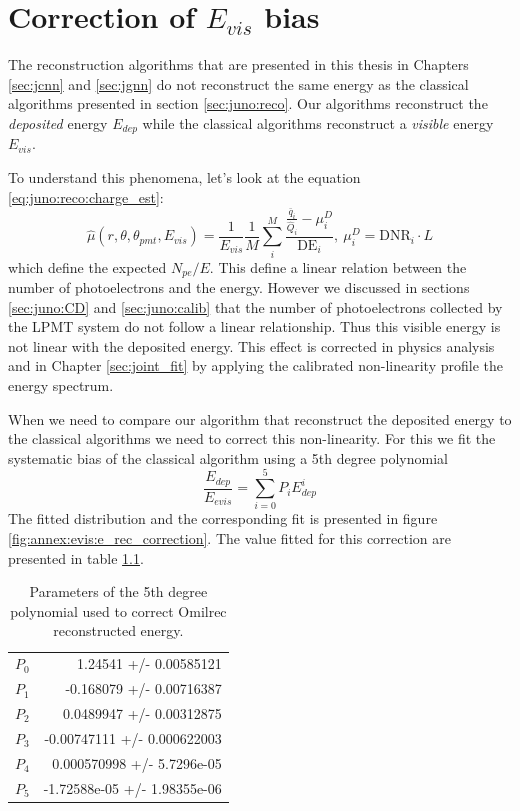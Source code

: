 \documentclass[../main.tex]{subfiles}
\begin{document}
\chapter{Correction of $E_{vis}$ bias}
\label{sec:annex:evis}

The reconstruction algorithms that are presented in this thesis in Chapters \ref{sec:jcnn} and \ref{sec:jgnn} do not reconstruct the same energy as the classical algorithms presented in section \ref{sec:juno:reco}. Our algorithms reconstruct the \textit{deposited} energy $E_{dep}$ while the classical algorithms reconstruct a \textit{visible} energy $E_{vis}$.

To understand this phenomena, let's look at the equation \ref{eq:juno:reco:charge_est}:
\begin{equation*}
  \hat{\mu}(r, \theta, \theta_{pmt}, E_{vis}) = \frac{1}{E_{vis}} \frac{1}{M} \sum_i^M\frac{\frac{\bar{q}_i}{\hat{Q}_i} - \mu_i^D}{\mathrm{DE}_i}, ~ \mu_i^D = \mathrm{DNR}_i \cdot L
\end{equation*}
which define the expected $N_{pe}/E$. This define a linear relation between the number of photoelectrons and the energy. However we discussed in sections \ref{sec:juno:CD} and \ref{sec:juno:calib} that the number of photoelectrons collected by the LPMT system do not follow a linear relationship. Thus this visible energy is not linear with the deposited energy. This effect is corrected in physics analysis and in Chapter \ref{sec:joint_fit} by applying the calibrated non-linearity profile the energy spectrum.

When we need to compare our algorithm that reconstruct the deposited energy to the classical algorithms we need to correct this non-linearity. For this we fit the systematic bias of the classical algorithm using a 5th degree polynomial
\begin{equation}
  \frac{E_{dep}}{E_{evis}} = \sum_{i=0}^5 P_i E_{dep}^i
\end{equation}
The fitted distribution and the corresponding fit is presented in figure \ref{fig:annex:evis:e_rec_correction}. The value fitted for this correction are presented in table \ref{tab:annex:evis:omil_params}.

\begin{table}[ht]
  \centering
  \begin{tabular}{|l|r|}
    $P_0$                        &      1.24541   +/-   0.00585121  \\
    $P_1$                        &    -0.168079   +/-   0.00716387  \\
    $P_2$                        &    0.0489947   +/-   0.00312875  \\
    $P_3$                        &  -0.00747111   +/-   0.000622003 \\
    $P_4$                        &  0.000570998   +/-   5.7296e-05  \\
    $P_5$                        & -1.72588e-05   +/-   1.98355e-06 \\
  \end{tabular}
  \caption{Parameters of the 5th degree polynomial used to correct Omilrec reconstructed energy.}
  \label{tab:annex:evis:omil_params}
\end{table}
\end{document}
